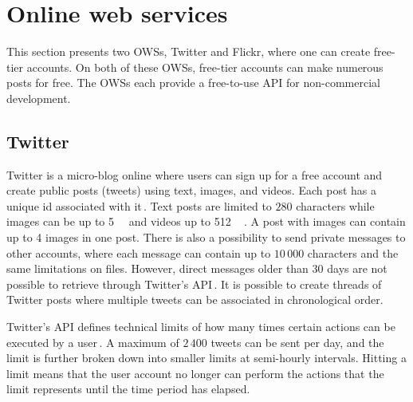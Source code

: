 \section{Online web services}
\label{sec:ows}
This section presents two \gls{OWS}s, Twitter and Flickr, where one can create \mbox{free-tier} accounts. On both of these \gls{OWS}s, \mbox{free-tier} accounts can make numerous posts for free. The \gls{OWS}s each provide a \mbox{free-to-use} \gls{API} for \mbox{non-commercial} development. 

\subsection{Twitter}
\label{subsec:ows_twitter}
Twitter is a \mbox{micro-blog} online where users can sign up for a free account and create public posts (tweets) using text, images, and videos. Each post has a unique id associated with it\,\cite{twitterTwitterIDs}. Text posts are limited to $280$ characters while images can be up to \SI{5}{\mega\byte} and videos up to \SI{512}{\mega\byte}\,\cite{MediaBestPractices}. A post with images can contain up to 4 images in one post. There is also a possibility to send private messages to other accounts, where each message can contain up to $10\,000$ characters and the same limitations on files. However, direct messages older than $30$ days are not possible to retrieve through Twitter's \gls{API}\,\cite{RetrievingOlder302018}. It is possible to create threads of Twitter posts where multiple tweets can be associated in chronological order.

Twitter's \gls{API} defines technical limits of how many times certain actions can be executed by a user\,\cite{UnderstandingTwitterLimits}. A maximum of $2\,400$ tweets can be sent per day, and the limit is further broken down into smaller limits at \mbox{semi-hourly} intervals. Hitting a limit means that the user account no longer can perform the actions that the limit represents until the time period has elapsed.

